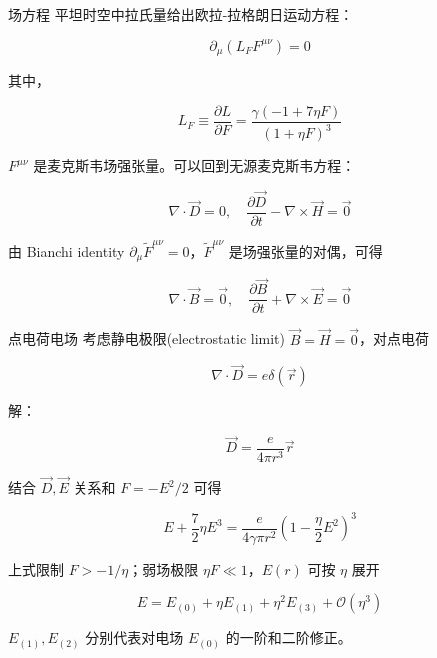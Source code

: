 \documentclass[9pt, dvipsnames]{beamer} %
\begin{document}
\begin{frame}{场方程}
    平坦时空中拉氏量给出欧拉-拉格朗日运动方程：

    $$
    \partial_\mu\left(L_F F^{\mu\nu} \right) = 0
    $$
    
    其中，
    
    $$
    L_F
    \equiv \frac{\partial L }{\partial F } 
    =\frac{\gamma(-1+7\eta F) }{(1+\eta F)^3 }
    $$
    
    $F^{\mu \nu} $ 是麦克斯韦场强张量。可以回到无源麦克斯韦方程：

    $$
    \boxed{
    \nabla\cdot\vec{D} = 0,\quad
    \frac{\partial \vec{D} }{\partial t } - \nabla\times\vec{H}= \vec{0}
    }
    $$
    
    由 Bianchi identity $\partial_\mu \tilde{F}^{\mu \nu}=0 $，$\tilde{F}^{\mu\nu} $ 是场强张量的对偶，可得
    
    $$
    \boxed{
    \nabla\cdot\vec{B} = \vec{0},\quad 
    \frac{\partial \vec{B} }{\partial t } + \nabla\times\vec{E} = \vec{0}
    }
    $$
\end{frame}

\begin{frame}{点电荷电场}
    考虑静电极限(electrostatic limit) $\vec{B}=\vec{H}=\vec{0} $，对点电荷

    $$
    \nabla\cdot\vec{D} = e\delta(\vec{r})
    $$
    
    解：
    
    $$
    \vec{D}
    =\frac{e }{4\pi r^3 } \vec{r}
    $$
    
    结合 $\vec{D},\vec{E} $ 关系和 $F=-E^2/2 $ 可得
    
    $$
    \boxed{
    E+\frac{7 }{2 } \eta E^3
    =\frac{e }{4\gamma \pi r^2 } \left(1-\frac{\eta  }{2 } E^2 \right)^3 
    }
    $$
    
    上式限制 $F>-1/\eta $；弱场极限 $\eta F\ll 1 $，$E(r) $ 可按 $\eta $ 展开
    
    $$
    E
    =E_{(0)} + \eta E_{(1)} + \eta^2 E_{(3)} + \mathcal{O}\left(\eta^3 \right)
    $$
    
    $E_{(1)},E_{(2)} $ 分别代表对电场 $E_{(0)} $ 的一阶和二阶修正。
\end{frame}
\end{document}
